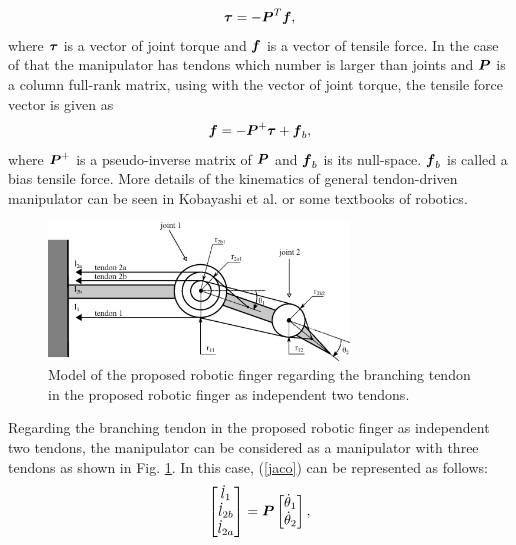 \documentclass{llncs}
\def\vect#1{\mbox{\boldmath$#1$}}
\begin{document}
\begin{align}
	\vect{\tau}=-\vect{P}^{T}\vect{f},
	\label{force_relation}
\end{align}
where $\vect{\tau}$ is a vector of joint torque and $\vect{f}$ is a vector of tensile force.
In the case of that the manipulator has tendons which number is larger than joints and $\vect{P}$ is a column full-rank matrix, using with the vector of joint torque, the tensile force vector is given as
\begin{align}
	\vect{f} = -\vect{P}^{+}\vect{\tau}+\vect{f}_{b},
	\label{tensile_force}
\end{align}
where $\vect{P}^{+}$ is a pseudo-inverse matrix of $\vect{P}$ and $\vect{f}_{b}$ is its null-space.
$\vect{f}_{b}$ is called a bias tensile force.
More details of the kinematics of general tendon-driven manipulator can be seen in Kobayashi et al.\cite{kobayashi1998} or some textbooks of robotics\cite{murrayi1994, tsai1999}.
\begin{figure}[t]
	\begin{center}
	\includegraphics[width=80mm]{fig/slacked.eps}
	\end{center}
	\caption{Model of the proposed robotic finger regarding the branching tendon in the proposed robotic finger as independent two tendons.}
	\label{nonbranching_model}
\end{figure}
Regarding the branching tendon in the proposed robotic finger as independent two tendons, the manipulator can be considered as a manipulator with three tendons as shown in Fig. \ref{nonbranching_model}.
In this case, (\ref{jaco}) can be represented as follows:
\begin{align}
	\begin{bmatrix}
		\dot{l}_{1}\\
		\dot{l}_{2b}\\
		\dot{l}_{2a}
	\end{bmatrix}
					=\vect{P}
					\begin{bmatrix}
					\dot{\theta}_{1}\\
					\dot{\theta}_{2}
					\end{bmatrix},
\label{jaco_relation}
\end{align}
\end{document}
